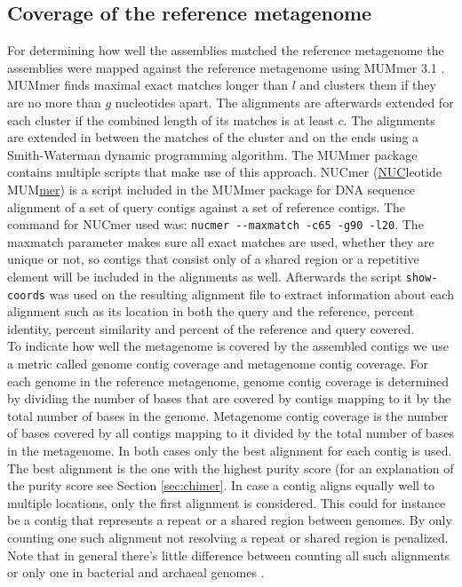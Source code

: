 \documentclass[a4paper,12pt]{report}
\begin{document}
\subsection{Coverage of the reference metagenome}
\label{sec:cov}
For determining how well the assemblies matched the reference metagenome the
assemblies were mapped against the reference metagenome using MUMmer 3.1
\cite{Kurtz14759262}.  MUMmer finds maximal exact matches longer than $l$ and
clusters them if they are no more than $g$ nucleotides apart. The alignments
are afterwards extended for each cluster if the combined length of its matches
is at least $c$. The alignments are extended in between the matches of the
cluster and on the ends using a Smith-Waterman dynamic programming algorithm.
The MUMmer package contains multiple scripts that make use of this approach.
NUCmer (\underline{NUC}leotide MUM\underline{mer}) is a script included in the
MUMmer package for DNA sequence alignment of a set of query contigs against a
set of reference contigs. The command for NUCmer used was:
\verb!nucmer --maxmatch -c65 -g90 -l20!. The maxmatch parameter makes sure all
exact matches are used, whether they are unique or not, so contigs that consist
only of a shared region or a repetitive element will be included in the
alignments as well. Afterwards the script \verb!show-coords! was used on the
resulting alignment file to extract information about each alignment such as
its location in both the query and the reference, percent identity, percent
similarity and percent of the reference and query covered.\\


To indicate how well the metagenome is covered by the assembled contigs we use
a metric called genome contig coverage and metagenome contig coverage. For each
genome in the reference metagenome, genome contig coverage is determined by
dividing the number of bases that are covered by contigs mapping to it by the
total number of bases in the genome. Metagenome contig coverage is the number
of bases covered by all contigs mapping to it divided by the total number of
bases in the metagenome. In both cases only the best alignment for each contig
is used. The best alignment is the one with the highest purity score (for an
explanation of the purity score see Section \ref{sec:chimer}. In case a contig
aligns equally well to multiple locations, only the first alignment is
considered. This could for instance be a contig that represents a repeat or a
shared region between genomes. By only counting one such alignment not
resolving a repeat or shared region is penalized. Note that in general there's
little difference between counting all such alignments or only one in bacterial
and archaeal genomes \cite{repeat shared region size}.
\end{document}
